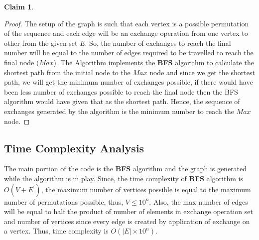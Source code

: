 \documentclass{article}
\let\bold\textbf
\newtheorem{claim}{Claim}[section]
\begin{document}
{{\begin{claim}
    \end{claim}
    \begin{proof}
      The setup of the graph is such that each vertex is a possible permutation of the sequence and each edge will be an exchange operation from one vertex to other from the given set $E$. \newline
      So, the number of exchanges to reach the final number will be equal to the number of edges required to be travelled to reach the final node ($Max$). \newline
      The Algorithm implements the \bold{BFS} algorithm to calculate the shortest path from the initial node to the $Max$ node and since we get the shortest path, we will get the minimum number of exchanges possible, if there would have been less number of exchanges possible to reach the final node then the BFS algorithm would have given that as the shortest path. \newline
      Hence, the sequence of exchanges generated by the algorithm is the minimum number to reach the $Max$ node.
    \end{proof}
  }
  \subsection{Time Complexity Analysis}{
    The main portion of the code is the \bold{BFS} algorithm and the graph is generated while the algorithm is in play. \newline
    Since, the time complexity of \bold{BFS} algorithm is $O(V+E^{'})$, the maximum number of vertices possible is equal to the maximum number of permutations possible, thus, $V\leq10^{n}$. \newline
    Also, the max number of edges will be equal to half the product of number of elements in exchange operation set and number of vertices since every edge is created by application of exchange on a vertex. \newline
    Thus, time complexity is $O(|E| \times 10^{n})$.
  }
}
\end{document}
